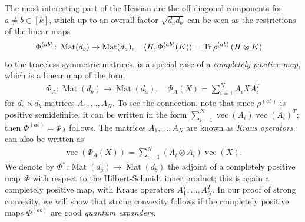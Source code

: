 \documentclass[aos]{imsart}
\theoremstyle{definition}
\numberwithin{equation}{section}
\DeclareMathOperator{\Mat}{Mat}
\DeclareMathOperator{\tr}{Tr}
\DeclareMathOperator{\vect}{vec}
\newcommand{\ot}{\otimes}
\begin{document}
The most interesting part of the Hessian are the off-diagonal components for $a\neq b\in[k]$, which up to an overall factor $\sqrt{d_a d_b}$ can be seen as the restrictions of the linear maps
\begin{align}\label{eq:hessian channel}
  \Phi^{(ab)} \colon \Mat(d_b) \to \Mat(d_a), \quad \braket{H, \Phi^{(ab)}(K)} &= \tr \rho^{(ab)} \left( H \ot K \right)
\end{align}
to the traceless symmetric matrices.
 is a special case of a \emph{completely positive map}, which is a linear map of the form
\begin{align}\label{eq:def cp}
  \Phi_A \colon \Mat(d_b) \to \Mat(d_a), \quad \Phi_A(X) = \sum_{i=1}^N A_i X A_i^T
\end{align}
for $d_a\times d_b$ matrices $A_1,\dots,A_N$.
To see the connection, note that since $\rho^{(ab)}$ is positive semidefinite, it can be written in the form $\sum_{i=1}^N \vect(A_i) \vect(A_i)^T$; then $\Phi^{(ab)} = \Phi_A$ follows.
The matrices $A_1,\dots,A_N$ are known as \emph{Kraus operators}.
 can also be written as
\begin{align}\label{eq:vec rep}
  \vect(\Phi_A(X)) = \sum_{i=1}^N (A_i \ot A_i) \vect(X).
\end{align}
We denote by $\Phi^*\colon\Mat(d_a)\to\Mat(d_b)$ the adjoint of a completely positive map~$\Phi$ with respect to the Hilbert-Schmidt inner product; this is again a completely positive map, with Kraus operators $A_1^T,\dots,A_N^T$.
%
In our proof of strong convexity, we will show that strong convexity follows if the completely positive maps $\Phi^{(ab)}$ are good \emph{quantum expanders}.
\end{document}
